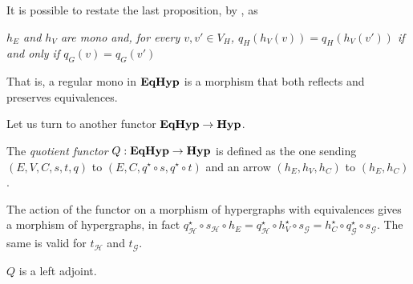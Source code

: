 \begin{remark}
    It is possible to restate the last proposition, by , as 
    \begin{displayquote}
    \textit{$h_E$ and $h_V$ are mono and, for every $v, v'\in V_H$, $q_H(h_V(v))=q_H(h_V(v'))$ if and only if $q_G(v)=q_G(v')$}
    \end{displayquote}
    That is, a regular mono in $\textbf{\textup{EqHyp}}$ is a morphism that both reflects and preserves equivalences.
\end{remark}

Let us turn to another functor $\textbf{\textup{EqHyp}} \to \textbf{\textup{Hyp}}$.

\begin{definition}
The \emph{quotient functor} $Q:\textbf{\textup{EqHyp}}\to \textbf{\textup{Hyp}} $ is defined as
the one sending $(E, V, C, s, t, q)$ to $(E, C, q^{\star}\circ s, q^{\star}\circ t)$ and an arrow $(h_E, h_V, h_C)$ to $(h_E, h_C)$.
\end{definition}

\begin{remark}
	The action of the functor on a morphism of hypergraphs with equivalences gives a morphism of hypergraphs,
	in fact $q^{\star}_\mathcal{H} \circ s_\mathcal{H} \circ h_E = q^{\star}_\mathcal{H} \circ h_V^\star \circ s_\mathcal{G} = h_C^\star \circ q^{\star}_\mathcal{G} \circ s_\mathcal{G}$.
	The same is valid for $t_\mathcal{H}$ and $t_\mathcal{G}$. 
\end{remark}

\begin{lemma}\label{lemma:quot_funct_left_adj}
    $Q$ is a left adjoint.
\end{lemma}

